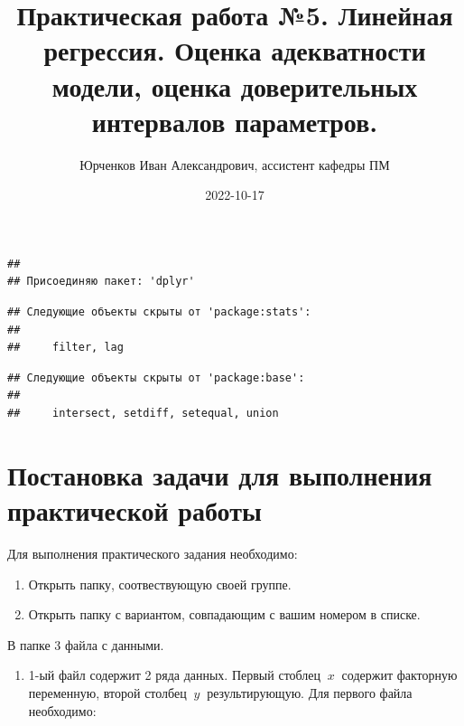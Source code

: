\documentclass[
]{article}
\title{Практическая работа №5. Линейная регрессия. Оценка адекватности
модели, оценка доверительных интервалов параметров.}
\author{Юрченков Иван Александрович, ассистент кафедры ПМ}
\date{2022-10-17}
\providecommand{\tightlist}{%
  \setlength{\itemsep}{0pt}\setlength{\parskip}{0pt}}
\begin{document}
\maketitle

\begin{verbatim}
## 
## Присоединяю пакет: 'dplyr'
\end{verbatim}

\begin{verbatim}
## Следующие объекты скрыты от 'package:stats':
## 
##     filter, lag
\end{verbatim}

\begin{verbatim}
## Следующие объекты скрыты от 'package:base':
## 
##     intersect, setdiff, setequal, union
\end{verbatim}

\hypertarget{ux43fux43eux441ux442ux430ux43dux43eux432ux43aux430-ux437ux430ux434ux430ux447ux438-ux434ux43bux44f-ux432ux44bux43fux43eux43bux43dux435ux43dux438ux44f-ux43fux440ux430ux43aux442ux438ux447ux435ux441ux43aux43eux439-ux440ux430ux431ux43eux442ux44b}{%
\section{\texorpdfstring{\textbf{Постановка задачи для выполнения
практической
работы}}{Постановка задачи для выполнения практической работы}}\label{ux43fux43eux441ux442ux430ux43dux43eux432ux43aux430-ux437ux430ux434ux430ux447ux438-ux434ux43bux44f-ux432ux44bux43fux43eux43bux43dux435ux43dux438ux44f-ux43fux440ux430ux43aux442ux438ux447ux435ux441ux43aux43eux439-ux440ux430ux431ux43eux442ux44b}}

Для выполнения практического задания необходимо:

\begin{enumerate}
\def\labelenumi{\arabic{enumi}.}
\item
  Открыть папку, соотвествующую своей группе.
\item
  Открыть папку с вариантом, совпадающим с вашим номером в списке.
\end{enumerate}

В папке 3 файла с данными.

\begin{enumerate}
\def\labelenumi{\arabic{enumi}.}
\tightlist
\item
  1-ый файл содержит 2 ряда данных. Первый стоблец \(\ x\ \) содержит
  факторную переменную, второй столбец \(\ y\ \) результирующую. Для
  первого файла необходимо:
\end{enumerate}
\end{document}
